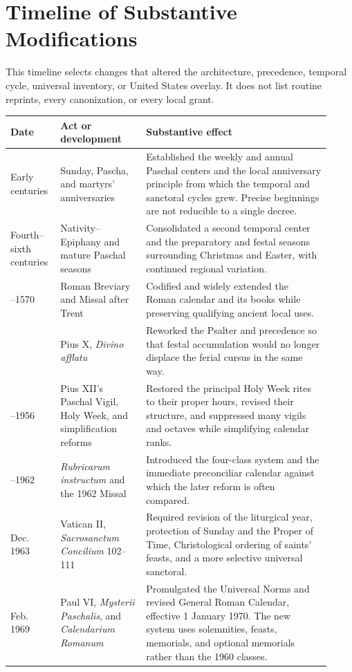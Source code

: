 \section{Timeline of Substantive Modifications}

This timeline selects changes that altered the architecture, precedence, temporal cycle, universal inventory, or United States overlay. It does not list routine reprints, every canonization, or every local grant.

\begin{longtable}{>{\raggedright\arraybackslash}p{0.13\linewidth}>{\raggedright\arraybackslash}p{0.25\linewidth}>{\raggedright\arraybackslash}p{0.54\linewidth}}
\toprule
Date & Act or development & Substantive effect\\
\midrule
\endhead
Early centuries & Sunday, Pascha, and martyrs' anniversaries & Established the weekly and annual Paschal centers and the local anniversary principle from which the temporal and sanctoral cycles grew. Precise beginnings are not reducible to a single decree.\\
Fourth--sixth centuries & Nativity--Epiphany and mature Paschal seasons & Consolidated a second temporal center and the preparatory and festal seasons surrounding Christmas and Easter, with continued regional variation.\\
1568--1570 & Roman Breviary and Missal after Trent & Codified and widely extended the Roman calendar and its books while preserving qualifying ancient local uses.\\
1911 & Pius X, \emph{Divino afflatu} & Reworked the Psalter and precedence so that festal accumulation would no longer displace the ferial cursus in the same way.\\
1951--1956 & Pius XII's Paschal Vigil, Holy Week, and simplification reforms & Restored the principal Holy Week rites to their proper hours, revised their structure, and suppressed many vigils and octaves while simplifying calendar ranks.\\
1960--1962 & \emph{Rubricarum instructum} and the 1962 Missal & Introduced the four-class system and the immediate preconciliar calendar against which the later reform is often compared.\\
4 Dec. 1963 & Vatican II, \emph{Sacrosanctum Concilium} 102--111 & Required revision of the liturgical year, protection of Sunday and the Proper of Time, Christological ordering of saints' feasts, and a more selective universal sanctoral.\\
14 Feb. 1969 & Paul VI, \emph{Mysterii Paschalis}, and \emph{Calendarium Romanum} & Promulgated the Universal Norms and revised General Roman Calendar, effective 1 January 1970. The new system uses solemnities, feasts, memorials, and optional memorials rather than the 1960 classes.\\

\end{longtable}
